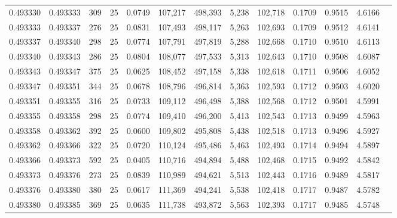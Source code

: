 \begin{tabular}{rrrrrrrrrrrrr}
0.493330 & 0.493333 &   309 &  25 &                                     0.0749 & 107,217 & 498,393 &   5,238 & 102,718 & 0.1709 & 0.9515 & 4.6166 \\
0.493333 & 0.493337 &   276 &  25 &                                     0.0831 & 107,493 & 498,117 &   5,263 & 102,693 & 0.1709 & 0.9512 & 4.6141 \\
0.493337 & 0.493340 &   298 &  25 &                                     0.0774 & 107,791 & 497,819 &   5,288 & 102,668 & 0.1710 & 0.9510 & 4.6113 \\
0.493340 & 0.493343 &   286 &  25 &                                     0.0804 & 108,077 & 497,533 &   5,313 & 102,643 & 0.1710 & 0.9508 & 4.6087 \\
0.493343 & 0.493347 &   375 &  25 &                                     0.0625 & 108,452 & 497,158 &   5,338 & 102,618 & 0.1711 & 0.9506 & 4.6052 \\
0.493347 & 0.493351 &   344 &  25 &                                     0.0678 & 108,796 & 496,814 &   5,363 & 102,593 & 0.1712 & 0.9503 & 4.6020 \\
0.493351 & 0.493355 &   316 &  25 &                                     0.0733 & 109,112 & 496,498 &   5,388 & 102,568 & 0.1712 & 0.9501 & 4.5991 \\
0.493355 & 0.493358 &   298 &  25 &                                     0.0774 & 109,410 & 496,200 &   5,413 & 102,543 & 0.1713 & 0.9499 & 4.5963 \\
0.493358 & 0.493362 &   392 &  25 &                                     0.0600 & 109,802 & 495,808 &   5,438 & 102,518 & 0.1713 & 0.9496 & 4.5927 \\
0.493362 & 0.493366 &   322 &  25 &                                     0.0720 & 110,124 & 495,486 &   5,463 & 102,493 & 0.1714 & 0.9494 & 4.5897 \\
0.493366 & 0.493373 &   592 &  25 &                                     0.0405 & 110,716 & 494,894 &   5,488 & 102,468 & 0.1715 & 0.9492 & 4.5842 \\
0.493373 & 0.493376 &   273 &  25 &                                     0.0839 & 110,989 & 494,621 &   5,513 & 102,443 & 0.1716 & 0.9489 & 4.5817 \\
0.493376 & 0.493380 &   380 &  25 &                                     0.0617 & 111,369 & 494,241 &   5,538 & 102,418 & 0.1717 & 0.9487 & 4.5782 \\
0.493380 & 0.493385 &   369 &  25 &                                     0.0635 & 111,738 & 493,872 &   5,563 & 102,393 & 0.1717 & 0.9485 & 4.5748 \\

\end{tabular}
